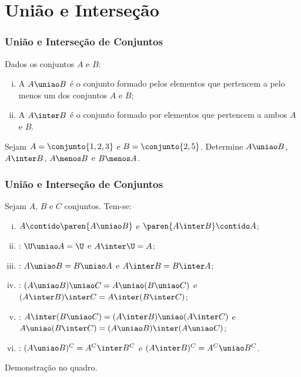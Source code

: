 \section{União e Interseção}


\begin{frame}
	\frametitle{União e Interseção de Conjuntos} 

	\begin{definicao}
		Dados os conjuntos $A$ e $B$:
		\begin{enumerate}[i.]
			\item A  $A \uniao B$ é o conjunto formado pelos elementos que pertencem a pelo menos um dos conjuntos $A$ e $B$;
			\item A  $A \inter B$ é o conjunto formado por elementos que pertencem a ambos $A$ e $B$.
		\end{enumerate}
	\end{definicao}

	\begin{exemplo}
		Sejam $A = \conjunto{1, 2, 3}$ e $B = \conjunto{2, 5}$. Determine $A \uniao B$, $A \inter B$, $A \menos B$ e $B \menos A$.
	\end{exemplo}
\end{frame}


\begin{frame}
	\frametitle{União e Interseção de Conjuntos} 
	
	\begin{proposicao}
		\label{propuniaoint}
		Sejam $A$, $B$ e $C$ conjuntos. Tem-se:
		\begin{enumerate}[i.]
			\item $A \contido \paren{A \uniao B}$ e $\paren{A \inter B} \contido A$;
			\item {}: $\U \uniao A = \U$ e $A \inter \U = A$;
			\item {}: $A \uniao B = B \uniao A$ e $A \inter B = B \inter A$;
			\item {}: $(A \uniao B) \uniao C = A \uniao (B \uniao C)$ e $(A \inter B) \inter C = A \inter (B \inter C)$;
			\item {}: $A \inter
			(B \uniao C) = (A \inter B) \uniao (A \inter C)$ e $A \uniao (B \inter C) = (A \uniao B) \inter (A \uniao C)$;
			\item {}: $(A \uniao B)^C = A^C \inter B^C$ e $(A \inter B)^C = A^C \uniao B^C$.
		\end{enumerate}
	\end{proposicao}

	Demonstração no quadro.
\end{frame}